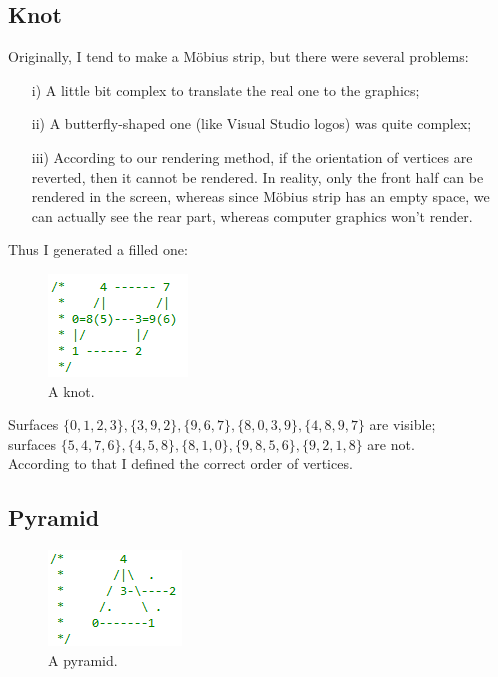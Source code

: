\documentclass[11pt]{article}
\begin{document}
\subsection{Knot} \label{ssec:1.1}
Originally, I tend to make a M\"obius strip, but there were several problems:
\begin{itemize}
	\item [i)] A little bit complex to translate the real one to the graphics;
	\item [ii)] A butterfly-shaped one (like Visual Studio logos) was quite complex;
	\item [iii)] According to our rendering method, if the orientation of vertices are reverted, then it cannot be rendered. In reality, only the front half can be rendered in the screen, whereas since M\"obius strip has an empty space, we can actually see the rear part, whereas computer graphics won't render.
\end{itemize}
Thus I generated a filled one:
\newpage
\begin{figure}[htb]
	\begin{center}
		\includegraphics[width=0.3\linewidth]{knot.png}
	\end{center}
	\caption{A knot.}
\end{figure}
Surfaces $\{0, 1, 2, 3\}, \{3, 9, 2\}, \{9, 6, 7\}, \{8, 0, 3, 9\}, \{4, 8, 9, 7\}$ are visible; \\ surfaces $\{5, 4, 7, 6\}, \{4, 5, 8\}, \{8, 1, 0\}, \{9, 8, 5, 6\}, \{ 9, 2, 1, 8\}$ are not. \\ According to that I defined the correct order of vertices.

\subsection{Pyramid} \label{ssec:1.2}
\begin{figure}[htb]
	\begin{center}
		\includegraphics[width=0.3\linewidth]{pyramid.png}
	\end{center}
	\caption{A pyramid.}
\end{figure}
\end{document}
